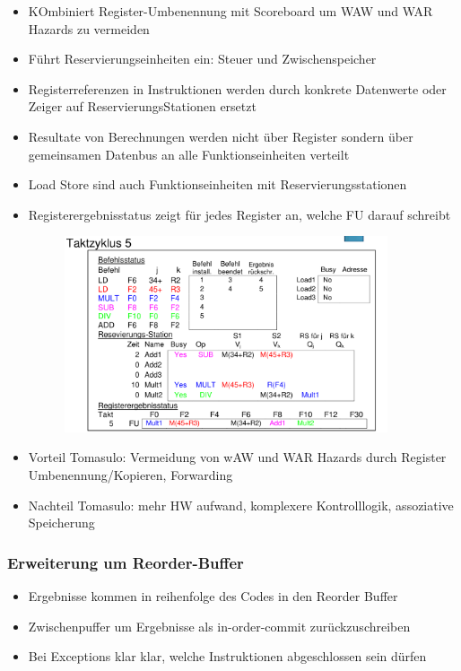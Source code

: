 \begin{itemize}
	\item
		KOmbiniert Register-Umbenennung mit Scoreboard um WAW und WAR Hazards zu vermeiden
	\item
		Führt Reservierungseinheiten ein: Steuer und Zwischenspeicher
	\item
		Registerreferenzen in Instruktionen werden durch konkrete Datenwerte oder Zeiger auf ReservierungsStationen ersetzt
	\item
		Resultate von Berechnungen werden nicht über Register sondern über gemeinsamen Datenbus an alle Funktionseinheiten verteilt
	\item
		Load Store sind auch Funktionseinheiten mit Reservierungsstationen
	\item
		Registerergebnisstatus zeigt für jedes Register an, welche FU darauf schreibt
		\begin{figure}[hpbt]
			\centering
			\includegraphics[width=0.9\textwidth]{img/tomasulo.png}
			\caption{}
			\label{fig:tomasulo}
		\end{figure}

	\item
		Vorteil Tomasulo: Vermeidung von wAW und WAR Hazards durch Register Umbenennung/Kopieren, Forwarding
	\item
		Nachteil Tomasulo: mehr HW aufwand, komplexere Kontrolllogik, assoziative Speicherung

\end{itemize}
\subsubsection{Erweiterung um Reorder-Buffer}
\begin{itemize}
	\item
		Ergebnisse kommen in reihenfolge des Codes in den Reorder Buffer
	\item
		Zwischenpuffer um Ergebnisse als in-order-commit zurückzuschreiben
	\item
		Bei Exceptions klar klar, welche Instruktionen abgeschlossen sein dürfen
\end{itemize}
